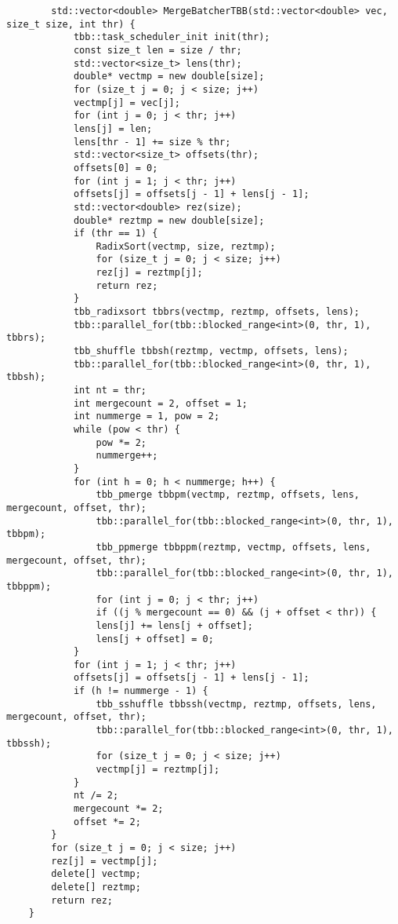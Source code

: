 \documentclass{report}
\begin{document}
\begin{lstlisting}
		std::vector<double> MergeBatcherTBB(std::vector<double> vec, size_t size, int thr) {
			tbb::task_scheduler_init init(thr);
			const size_t len = size / thr;
			std::vector<size_t> lens(thr);
			double* vectmp = new double[size];
			for (size_t j = 0; j < size; j++)
			vectmp[j] = vec[j];
			for (int j = 0; j < thr; j++)
			lens[j] = len;
			lens[thr - 1] += size % thr;
			std::vector<size_t> offsets(thr);
			offsets[0] = 0;
			for (int j = 1; j < thr; j++)
			offsets[j] = offsets[j - 1] + lens[j - 1];
			std::vector<double> rez(size);
			double* reztmp = new double[size];
			if (thr == 1) {
				RadixSort(vectmp, size, reztmp);
				for (size_t j = 0; j < size; j++)
				rez[j] = reztmp[j];
				return rez;
			}
			tbb_radixsort tbbrs(vectmp, reztmp, offsets, lens);
			tbb::parallel_for(tbb::blocked_range<int>(0, thr, 1), tbbrs);
			tbb_shuffle tbbsh(reztmp, vectmp, offsets, lens);
			tbb::parallel_for(tbb::blocked_range<int>(0, thr, 1), tbbsh);
			int nt = thr;
			int mergecount = 2, offset = 1;
			int nummerge = 1, pow = 2;
			while (pow < thr) {
				pow *= 2;
				nummerge++;
			}
			for (int h = 0; h < nummerge; h++) {
				tbb_pmerge tbbpm(vectmp, reztmp, offsets, lens, mergecount, offset, thr);
				tbb::parallel_for(tbb::blocked_range<int>(0, thr, 1), tbbpm);
				tbb_ppmerge tbbppm(reztmp, vectmp, offsets, lens, mergecount, offset, thr);
				tbb::parallel_for(tbb::blocked_range<int>(0, thr, 1), tbbppm);
				for (int j = 0; j < thr; j++)
				if ((j % mergecount == 0) && (j + offset < thr)) {
				lens[j] += lens[j + offset];
				lens[j + offset] = 0;
			}
			for (int j = 1; j < thr; j++)
			offsets[j] = offsets[j - 1] + lens[j - 1];
			if (h != nummerge - 1) {
				tbb_sshuffle tbbssh(vectmp, reztmp, offsets, lens, mergecount, offset, thr);
				tbb::parallel_for(tbb::blocked_range<int>(0, thr, 1), tbbssh);
				for (size_t j = 0; j < size; j++)
				vectmp[j] = reztmp[j];
			}
			nt /= 2;
			mergecount *= 2;
			offset *= 2;
		}
		for (size_t j = 0; j < size; j++)
		rez[j] = vectmp[j];
		delete[] vectmp;
		delete[] reztmp;
		return rez;
	}


\end{lstlisting}
\end{document}

